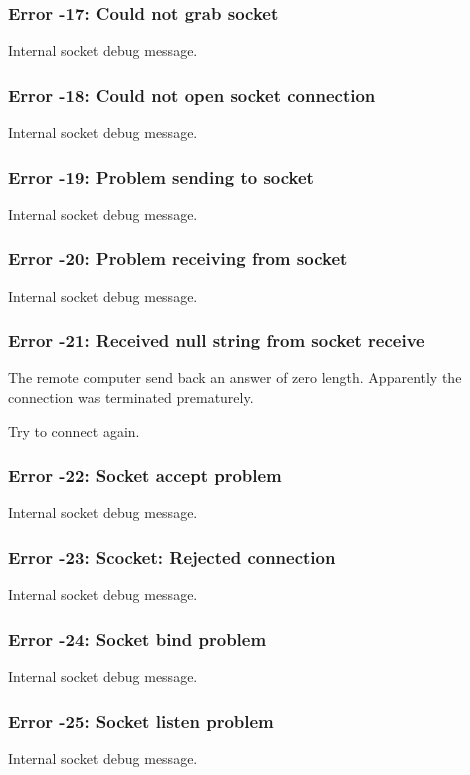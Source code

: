 \subsubsection{Error -17: Could not grab socket}
\par
Internal socket debug message. 
\subsubsection{Error -18: Could not open socket connection}
\par
Internal socket debug message. 
\subsubsection{Error -19: Problem sending to socket}
\par
Internal socket debug message. 
\subsubsection{Error -20: Problem receiving from socket}
\par
Internal socket debug message. 
\subsubsection{Error -21: Received null string from socket receive}
\par
The remote computer send back an answer of zero length. Apparently 
the connection was terminated prematurely. 
\par
Try to connect again. 
\subsubsection{Error -22: Socket accept problem}
\par
Internal socket debug message. 
\subsubsection{Error -23: Scocket: Rejected connection}
\par
Internal socket debug message. 
\subsubsection{Error -24: Socket bind problem}
\par
Internal socket debug message. 
\subsubsection{Error -25: Socket listen problem}
\par
Internal socket debug message. 
